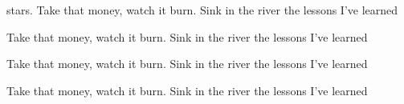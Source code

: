 \begin{song}



stars. Take that money, watch it burn. Sink in the river the lessons I've learned \par
{}Take that money, watch it burn. Sink in the river the lessons I've learned \par
{}Take that money, watch it burn. Sink in the river the lessons I've learned \par
{}Take that money, watch it burn. Sink in the river the lessons I've learned \par

\end{song}
